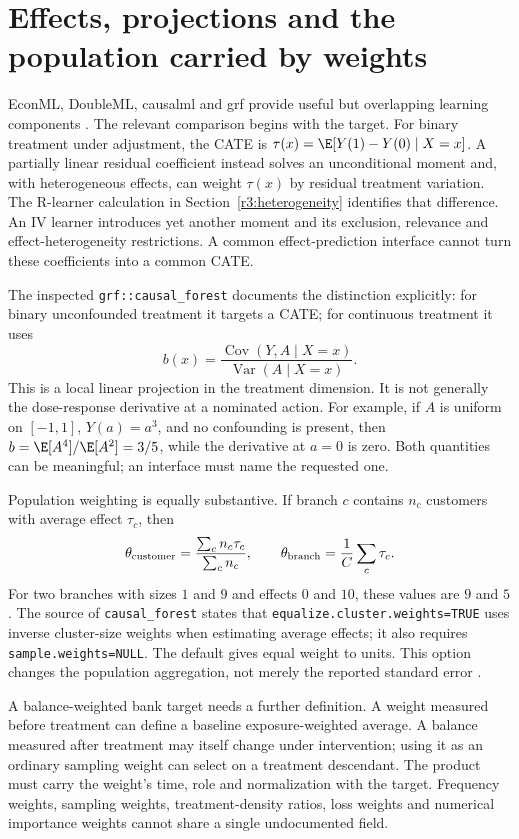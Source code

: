 \section{Effects, projections and the population carried by weights}
\label{r3:software-effects}

EconML, DoubleML, causalml and grf provide useful but overlapping learning
components \citep{sw_econml,sw_doubleml,sw_causalml,sw_grf}. The relevant
comparison begins with the target. For binary treatment under adjustment,
the CATE is $\tau(x)=\E[Y(1)-Y(0)\mid X=x]$. A partially linear residual
coefficient instead solves an unconditional moment and, with heterogeneous
effects, can weight $\tau(x)$ by residual treatment variation. The
R-learner calculation in Section~\ref{r3:heterogeneity} identifies that
difference. An IV learner introduces yet another moment and its exclusion,
relevance and effect-heterogeneity restrictions. A common effect-prediction
interface cannot turn these coefficients into a common CATE.

The inspected \texttt{grf::causal\_forest} documents the distinction
explicitly: for binary unconfounded treatment it targets a CATE; for
continuous treatment it uses
\[
 b(x)=\frac{\operatorname{Cov}(Y,A\mid X=x)}
                 {\operatorname{Var}(A\mid X=x)}.
\]
This is a local linear projection in the treatment dimension. It is not
generally the dose-response derivative at a nominated action. For example,
if $A$ is uniform on $[-1,1]$, $Y(a)=a^3$, and no confounding is present,
then $b=\E[A^4]/\E[A^2]=3/5$, while the derivative at $a=0$ is zero.
Both quantities can be meaningful; an interface must name the requested one.

Population weighting is equally substantive. If branch $c$ contains $n_c$
customers with average effect $\tau_c$, then
\[
 \theta_{\rm customer}=
 \frac{\sum_c n_c\tau_c}{\sum_c n_c},
 \qquad
 \theta_{\rm branch}=\frac1C\sum_c\tau_c.
\]
For two branches with sizes $1$ and $9$ and effects $0$ and $10$, these
values are $9$ and $5$. The source of \texttt{causal\_forest} states that
\texttt{equalize.cluster.weights=TRUE} uses inverse cluster-size weights
when estimating average effects; it also requires
\texttt{sample.weights=NULL}. The default gives equal weight to units.
This option changes the population aggregation, not merely the reported
standard error \citep{sw_grf}.

A balance-weighted bank target needs a further definition. A weight
measured before treatment can define a baseline exposure-weighted average.
A balance measured after treatment may itself change under intervention;
using it as an ordinary sampling weight can select on a treatment
descendant. The product must carry the weight's time, role and normalization
with the target. Frequency weights, sampling weights, treatment-density
ratios, loss weights and numerical importance weights cannot share a
single undocumented field.

